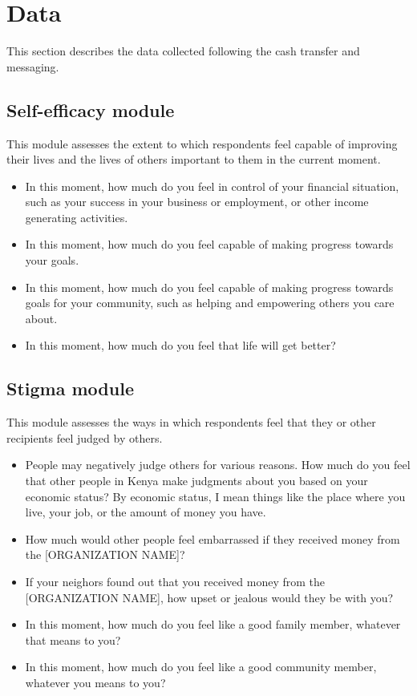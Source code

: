 \documentclass[11pt, a4paper]{article}\usepackage[]{graphicx}\usepackage[]{color}
\begin{document}
\section{Data}

    This section describes the data collected following the cash transfer and messaging.

    \subsection{Self-efficacy module}

        This module assesses the extent to which respondents feel capable of improving their lives and the lives of others important to them in the current moment.

        \begin{itemize}
        \itemsep0em
            \item In this moment, how much do you feel in control of your financial situation, such as your success in your business or employment, or other income generating activities.
            \item In this moment, how much do you feel capable of making progress towards your goals.
            \item In this moment, how much do you feel capable of making progress towards goals for your community, such as helping and empowering others you care about.
            \item In this moment, how much do you feel that life will get better?
        \end{itemize}

    \subsection{Stigma module}

        This module assesses the ways in which respondents feel that they or other recipients feel judged by others.

        \begin{itemize}
        \itemsep0em
            \item People may negatively judge others for various reasons. How much do you feel that other people in Kenya make judgments about you based on your economic status? By economic status, I mean things like the place where you live, your job, or the amount of money you have.
            \item How much would other people feel embarrassed if they received money from the [ORGANIZATION NAME]?
            \item If your neighors found out that you received money from the [ORGANIZATION NAME], how upset or jealous would they be with you?
            \item In this moment, how much do you feel like a good family member, whatever that means to you?
            \item In this moment, how much do you feel like a good community member, whatever you means to you?
      \end{itemize}
\end{document}
